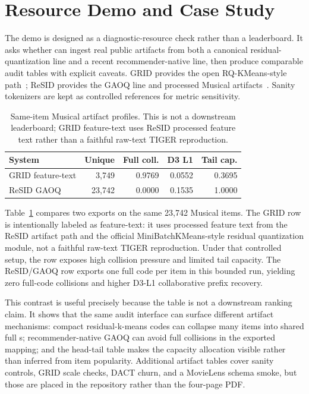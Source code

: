 \section{Resource Demo and Case Study}

The demo is designed as a diagnostic-resource check rather than a leaderboard.
It asks whether \tool can ingest real public \sid artifacts from both a
canonical residual-quantization line and a recent recommender-native line, then
produce comparable audit tables with explicit caveats. GRID provides the
open RQ-KMeans-style path~\cite{ju2025grid}; ReSID provides the GAOQ line and
processed Musical artifacts~\cite{liang2026resid}. Sanity tokenizers are kept
as controlled references for metric sensitivity.

\begin{table}[t]
\caption{Same-item Musical artifact profiles. This is not a downstream
leaderboard; GRID feature-text uses ReSID processed feature text rather than a
faithful raw-text TIGER reproduction.}
\label{tab:musical-diagnostic}
\small
\setlength{\tabcolsep}{2.8pt}
\begin{tabular}{@{}lrrrr@{}}
\toprule
System & Unique & Full coll. & D3 L1 & Tail cap. \\
\midrule
GRID feature-text & 3,749 & 0.9769 & 0.0552 & 0.3695 \\
ReSID GAOQ & 23,742 & 0.0000 & 0.1535 & 1.0000 \\
\bottomrule
\end{tabular}
\end{table}

Table~\ref{tab:musical-diagnostic} compares two exports on the same 23,742
Musical items. The GRID row is intentionally labeled as feature-text: it uses
processed feature text from the ReSID artifact path and the official
MiniBatchKMeans-style residual quantization module, not a faithful raw-text
TIGER reproduction. Under that controlled setup, the row exposes high collision
pressure and limited tail capacity. The ReSID/GAOQ row exports one full code
per item in this bounded run, yielding zero full-code collisions and higher
D3-L1 collaborative prefix recovery.

This contrast is useful precisely because the table is not a downstream
ranking claim. It shows that the same audit interface can surface different
artifact mechanisms: compact residual-k-means codes can collapse many items
into shared full \sid{}s; recommender-native GAOQ can avoid full collisions in
the exported mapping; and the head-tail table makes the capacity allocation
visible rather than inferred from item popularity. Additional artifact tables
cover sanity controls, GRID scale checks, DACT churn, and a MovieLens schema
smoke, but those are placed in the repository rather than the four-page PDF.
